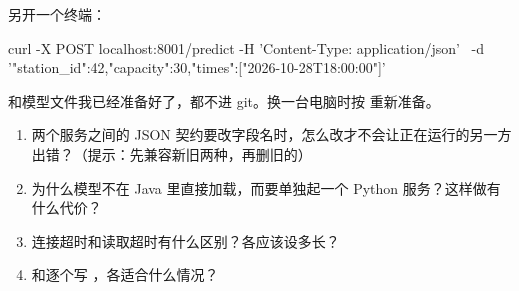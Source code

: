另开一个终端：

\begin{shell}
curl -X POST localhost:8001/predict -H 'Content-Type: application/json' \
     -d '{"station_id":42,"capacity":30,"times":["2026-10-28T18:00:00"]}'
\end{shell}

 和模型文件我已经准备好了，都不进 git。换一台电脑时按  重新准备。

\begin{think}
\begin{enumerate}
  \item 两个服务之间的 JSON 契约要改字段名时，怎么改才不会让正在运行的另一方出错？（提示：先兼容新旧两种，再删旧的）
  \item 为什么模型不在 Java 里直接加载，而要单独起一个 Python 服务？这样做有什么代价？
  \item 连接超时和读取超时有什么区别？各应该设多长？
  \item {} 和逐个写 ，各适合什么情况？
\end{enumerate}
\end{think}
